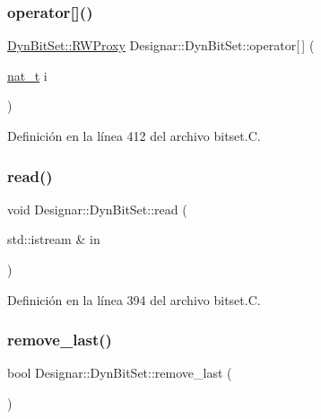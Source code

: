 \subsubsection{\texorpdfstring{operator[]()}{operator[]()}\hspace{0.1cm}{\footnotesize\ttfamily [2/2]}}
{\footnotesize\ttfamily \hyperlink{class_designar_1_1_dyn_bit_set_1_1_r_w_proxy}{Dyn\+Bit\+Set\+::\+R\+W\+Proxy} Designar\+::\+Dyn\+Bit\+Set\+::operator\mbox{[}$\,$\mbox{]} (\begin{DoxyParamCaption}\item[{\hyperlink{namespace_designar_aa72662848b9f4815e7bf31a7cf3e33d1}{nat\+\_\+t}}]{i }\end{DoxyParamCaption})}



Definición en la línea 412 del archivo bitset.\+C.

\mbox{\label{class_designar_1_1_dyn_bit_set_a18b74c7e27d2af9fefd48b1eabfd377d}} 
\subsubsection{\texorpdfstring{read()}{read()}}
{\footnotesize\ttfamily void Designar\+::\+Dyn\+Bit\+Set\+::read (\begin{DoxyParamCaption}\item[{std\+::istream \&}]{in }\end{DoxyParamCaption})}



Definición en la línea 394 del archivo bitset.\+C.

\mbox{\label{class_designar_1_1_dyn_bit_set_a0ecc1cd2ec0e273ecaab4c81e769e589}} 
\subsubsection{\texorpdfstring{remove\+\_\+last()}{remove\_last()}}
{\footnotesize\ttfamily bool Designar\+::\+Dyn\+Bit\+Set\+::remove\+\_\+last (\begin{DoxyParamCaption}{ }\end{DoxyParamCaption})}



